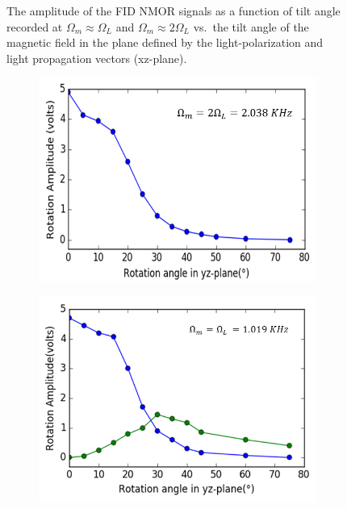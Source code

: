 \begin{figure}
\begin{subfigure}[b]{0.45\textwidth}
        \caption{}
        \label{fig:three sin x}
    \end{subfigure}
    \caption{ The amplitude of the FID NMOR signals as a function of
      tilt angle recorded at $\Omega_m\approx\Omega_L$ and
      $\Omega_m\approx 2\Omega_L$ vs.~the tilt angle of the magnetic
      field in the plane defined by the light-polarization and light
      propagation vectors (xz-plane). \label{fig:tilted-wrong}}
\end{figure}

\begin{figure}
    \centering
   \begin{subfigure}[b]{0.45\textwidth}
        \includegraphics[width=\textwidth]{figures/tilt_y_larmor.png}
        \caption{}
        \label{fig:tilt_y}
    \end{subfigure}
    \hfill
     \begin{subfigure}[b]{0.45\textwidth}
        \centering
        \includegraphics[width=\textwidth]{figures/tilt_y_2larmor.png}

\end{subfigure}
\end{figure}
